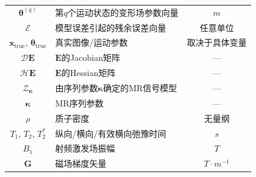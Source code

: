 \documentclass[12pt]{article}
\begin{document}
\begin{table}[h]
\begin{tabularx}{\textwidth}{c X c}
        $\bm{\theta}^{(q)}$ & 第$q$个运动状态的变形场参数向量 & $\si{m}$ \\
        $\mathcal{E}$ & 模型误差引起的残余误差向量 & 任意单位 \\
        $\bm{x}_\mathrm{true}$, $\bm{\theta}_\mathrm{true}$ & 真实图像/运动参数 & 取决于具体变量 \\
        $\mathcal{D}\mathbf{E}$ & $\mathbf{E}$的Jacobian矩阵 & --- \\
        $\mathcal{H}\mathbf{E}$ & $\mathbf{E}$的Hessian矩阵 & --- \\
        $\mathcal{Z}_{\bm{\kappa}}$ & 由序列参数$\bm{\kappa}$确定的MR信号模型 & --- \\
        $\bm{\kappa}$ & MR序列参数 & --- \\
        $\rho$ & 质子密度 & 无量纲 \\
        $T_1$, $T_2$, $T_2^*$ & 纵向/横向/有效横向弛豫时间 & $\si{s}$ \\
        $B_1$ & 射频激发场振幅 & $\si{T}$ \\
        $\bm{G}$ & 磁场梯度矢量 & $\si{T\cdot m^{-1}}$ \\
        \bottomrule
    \end{tabularx}
\end{table}

\printbibliography
\end{document}

